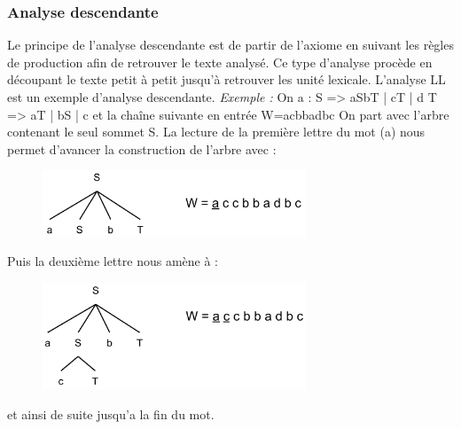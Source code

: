 \documentclass{article}
\begin{document}
\subsubsection{Analyse descendante}\label{sec:analyseDes}
Le principe de l’analyse descendante est de partir de l’axiome en suivant les règles de production afin de retrouver le texte analysé. Ce type d’analyse procède en découpant le texte petit à petit jusqu'à retrouver les unité lexicale. L’analyse LL est un exemple d’analyse descendante.\newline
\textit{Exemple :}\newline
On a :\newline
S => aSbT | cT | d\newline
T => aT | bS | c \newline
et la chaîne suivante en entrée W=acbbadbc\newline
On part avec l'arbre contenant le seul sommet S.
La lecture de la première lettre du mot (a) nous permet d'avancer la construction de l'arbre avec :

\begin{figure}[h]
	\centering
		\includegraphics[width=0.70\textwidth]{AnalyseDescendante1.png}
	\label{fig:AnalyseDescendante1}
\end{figure}\FloatBarrier

Puis la deuxième lettre nous amène à :

\begin{figure}[h]
	\centering
		\includegraphics[width=0.70\textwidth]{AnalyseDescendante2.png}
	\label{fig:AnalyseDescendante2}
\end{figure}\FloatBarrier

et ainsi de suite jusqu'a la fin du mot.
\end{document}
